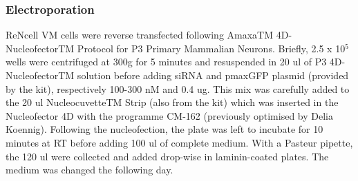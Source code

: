 \documentclass[onecolumn,10pt]{asme2ej}
\begin{document}
\subsubsection{Electroporation}
ReNcell VM cells were reverse transfected following AmaxaTM 4D-NucleofectorTM Protocol for P3 Primary Mammalian Neurons. Briefly, 2.5 x 10$^5$ wells were centrifuged at 300g for 5 minutes and resuspended in 20 ul of P3 4D-NucleofectorTM solution before adding siRNA and pmaxGFP plasmid (provided by the kit), respectively 100-300 nM and 0.4 ug. This mix was carefully added to the 20 ul NucleocuvetteTM Strip (also from the kit) which was inserted in the Nucleofector 4D with the programme CM-162 (previously optimised by Delia Koennig). Following the nucleofection, the plate was left to incubate for 10 minutes at RT before adding 100 ul of complete medium. With a Pasteur pipette, the 120 ul were collected and added drop-wise in laminin-coated plates. The medium was changed the following day.
%
%
\end{document}
